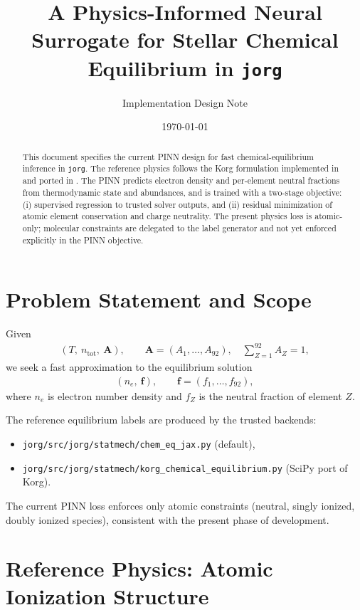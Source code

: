 \documentclass[11pt]{article}
\title{A Physics-Informed Neural Surrogate for Stellar Chemical Equilibrium in \texttt{jorg}}
\author{Implementation Design Note}
\date{\today}
\begin{document}
\maketitle

\begin{abstract}
This document specifies the current PINN design for fast chemical-equilibrium inference in \texttt{jorg}. The reference physics follows the Korg formulation implemented in  and ported in . The PINN predicts electron density and per-element neutral fractions from thermodynamic state and abundances, and is trained with a two-stage objective: (i) supervised regression to trusted solver outputs, and (ii) residual minimization of atomic element conservation and charge neutrality. The present physics loss is atomic-only; molecular constraints are delegated to the label generator and not yet enforced explicitly in the PINN objective.
\end{abstract}

\section{Problem Statement and Scope}
Given
\begin{align}
    \left(T,\ n_{\mathrm{tot}},\ \bm{A}\right), \qquad
    \bm{A} = (A_1,\dots,A_{92}), \quad \sum_{Z=1}^{92} A_Z = 1,
\end{align}
we seek a fast approximation to the equilibrium solution
\begin{align}
    \left(n_e,\ \bm{f}\right), \qquad \bm{f} = (f_1,\dots,f_{92}),
\end{align}
where $n_e$ is electron number density and $f_Z$ is the neutral fraction of element $Z$.

The reference equilibrium labels are produced by the trusted backends:
\begin{itemize}[leftmargin=1.5em]
    \item \texttt{jorg/src/jorg/statmech/chem\_eq\_jax.py} (default),
    \item \texttt{jorg/src/jorg/statmech/korg\_chemical\_equilibrium.py} (SciPy port of Korg).
\end{itemize}
The current PINN loss enforces only atomic constraints (neutral, singly ionized, doubly ionized species), consistent with the present phase of development.

\section{Reference Physics: Atomic Ionization Structure}
\end{document}
